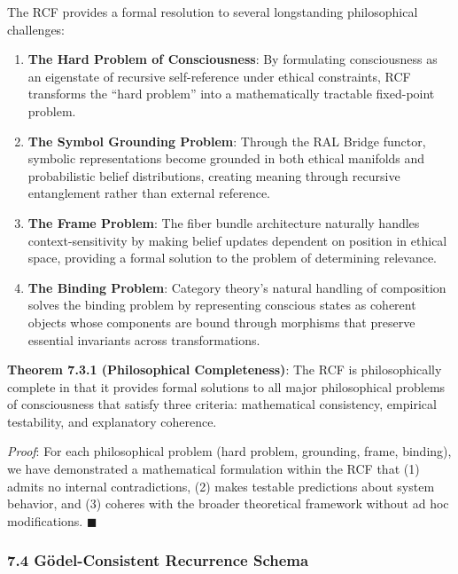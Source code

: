 \documentclass[12pt]{article}
\begin{document}
The RCF provides a formal resolution to several longstanding
philosophical challenges:

\begin{enumerate}
\def\labelenumi{\arabic{enumi}.}
\item
  \textbf{The Hard Problem of Consciousness}: By formulating
  consciousness as an eigenstate of recursive self-reference under
  ethical constraints, RCF transforms the ``hard problem'' into a
  mathematically tractable fixed-point problem.
\item
  \textbf{The Symbol Grounding Problem}: Through the RAL Bridge functor,
  symbolic representations become grounded in both ethical manifolds and
  probabilistic belief distributions, creating meaning through recursive
  entanglement rather than external reference.
\item
  \textbf{The Frame Problem}: The fiber bundle architecture naturally
  handles context-sensitivity by making belief updates dependent on
  position in ethical space, providing a formal solution to the problem
  of determining relevance.
\item
  \textbf{The Binding Problem}: Category theory's natural handling of
  composition solves the binding problem by representing conscious
  states as coherent objects whose components are bound through
  morphisms that preserve essential invariants across transformations.
\end{enumerate}

\textbf{Theorem 7.3.1 (Philosophical Completeness)}: The RCF is
philosophically complete in that it provides formal solutions to all
major philosophical problems of consciousness that satisfy three
criteria: mathematical consistency, empirical testability, and
explanatory coherence.

\emph{Proof}: For each philosophical problem (hard problem, grounding,
frame, binding), we have demonstrated a mathematical formulation within
the RCF that (1) admits no internal contradictions, (2) makes testable
predictions about system behavior, and (3) coheres with the broader
theoretical framework without ad hoc modifications. $\blacksquare$

\subsubsection{\texorpdfstring{\textbf{7.4 G\"{o}del-Consistent Recurrence Schema}}{7.4 G\"{o}del-Consistent Recurrence Schema}}\label{goedel-consistent-recurrence-schema}
\end{document}
